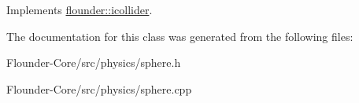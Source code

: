 Implements \hyperlink{classflounder_1_1icollider_a946ddd743680d0abc7b086d49f882e6f}{flounder\+::icollider}.



The documentation for this class was generated from the following files\+:\begin{DoxyCompactItemize}
\item 
Flounder-\/\+Core/src/physics/sphere.\+h\item 
Flounder-\/\+Core/src/physics/sphere.\+cpp\end{DoxyCompactItemize}
